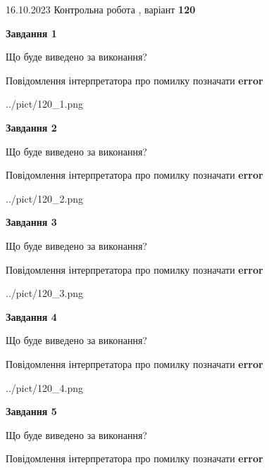 \documentclass[12pt, ukrainian]{article}
\begin{document}
{\Large{16.10.2023 Контрольна робота , варіант  \No \textbf { 120 }\par}}
{
\begin {large}
{\begin {center}\textbf{Завдання 1}\end {center}}\par
Що буде виведено за виконання? \par
Повідомлення інтерпретатора про помилку позначати \textbf{error}

\begin{center}
	{../pict/120_1.png}
\end{center}
\newpage

{\begin {center}\textbf{Завдання 2}\end {center}}\par
Що буде виведено за виконання? \par
Повідомлення інтерпретатора про помилку позначати \textbf{error}

\begin{center}
	{../pict/120_2.png}
\end{center}
\newpage

{\begin {center}\textbf{Завдання 3}\end {center}}\par
Що буде виведено за виконання? \par
Повідомлення інтерпретатора про помилку позначати \textbf{error}

\begin{center}
	{../pict/120_3.png}
\end{center}
\newpage

{\begin {center}\textbf{Завдання 4}\end {center}}\par
Що буде виведено за виконання? \par
Повідомлення інтерпретатора про помилку позначати \textbf{error}

\begin{center}
	{../pict/120_4.png}
\end{center}
\newpage

{\begin {center}\textbf{Завдання 5}\end {center}}\par
Що буде виведено за виконання? \par
Повідомлення інтерпретатора про помилку позначати \textbf{error}


\end{large}}
\end{document}
